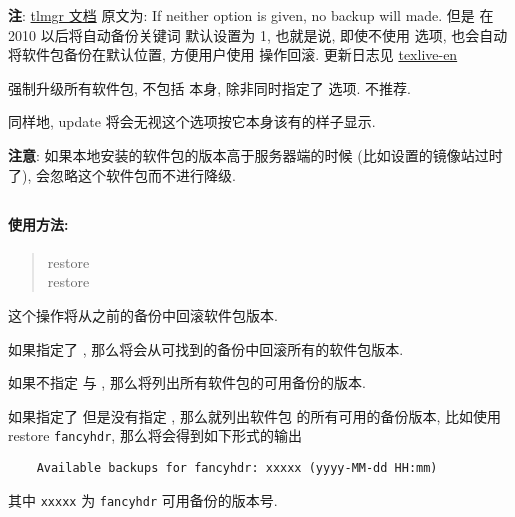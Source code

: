 \begin{description}
    \textbf{注}: \href{https://www.tug.org/texlive/doc/tlmgr.html#update-option...-pkg}{tlmgr 文档} 原文为: If neither option is given, no backup will made. 但是 \tlmgr 在 \tl{}2010 以后将自动备份关键词  默认设置为 1, 也就是说, 即使不使用  选项, 也会自动将软件包备份在默认位置, 方便用户使用  操作回滚. 更新日志见 \href{https://www.tug.org/texlive/doc/texlive-en/texlive-en.html#x1-780009.1.7}{texlive-en}

    \item {}\par
    强制升级所有软件包, 不包括 \tlmgr 本身, 除非同时指定了  选项. 不推荐. 

    同样地, \ac{update}  将会无视这个选项按它本身该有的样子显示. 
\end{description}

\textbf{注意}: 如果本地安装的软件包的版本高于服务器端的时候 (比如设置的镜像站过时了), \tlmgr 会忽略这个软件包而不进行降级. 

\clearpage

\subsection{}\label{subsec:restore}

\paragraph{使用方法:}

\begin{quote}
    \ac{restore}   \\
    \ac{restore} 
\end{quote}

这个操作将从之前的备份中回滚软件包版本. 

如果指定了 , 那么将会从可找到的备份中回滚所有的软件包版本. 

如果不指定  与 , 那么将列出所有软件包的可用备份的版本. 

如果指定了  但是没有指定 , 那么就列出软件包  的所有可用的备份版本, 比如使用 \tlmgr{} \ac{restore} \texttt{fancyhdr}, 那么将会得到如下形式的输出
\begin{verbatim}
    Available backups for fancyhdr: xxxxx (yyyy-MM-dd HH:mm)
\end{verbatim}
其中 \texttt{xxxxx} 为 \texttt{fancyhdr} 可用备份的版本号.

